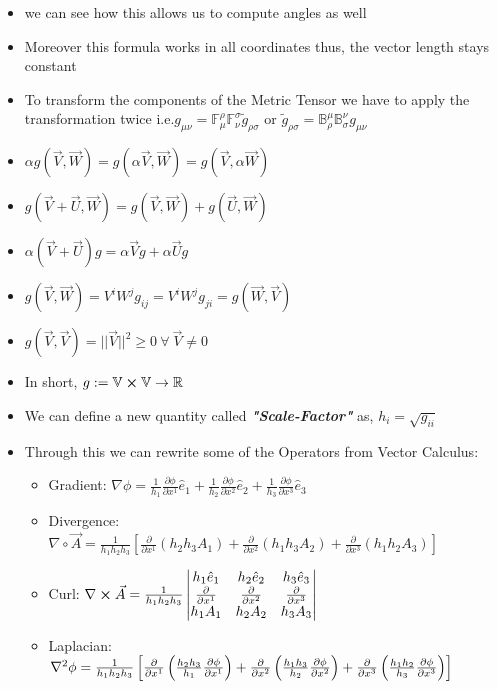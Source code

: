 \begin{itemize}
	\item we can see how this allows us to compute angles as well
	\item Moreover this formula works in all coordinates thus, the vector length stays constant
	\item To transform the components of the Metric Tensor we have to apply the transformation twice i.e.$g_{\mu \nu} = \mathbb{F}^{\rho}_{\mu} \mathbb{F}^{\sigma}_{\nu}\tilde{g}_{\rho \sigma}$ or $\tilde{g}_{\rho \sigma} = \mathbb{B}^{\mu}_{\rho} \mathbb{B}^{\nu}_{\sigma}g_{\mu \nu}$
	\item $\alpha g(\vec{V}, \vec{W}) = g(\alpha\vec{V}, \vec{W}) =  g(\vec{V}, \alpha\vec{W})$
	\item $g(\vec{V} + \vec{U}, \vec{W}) = g(\vec{V}, \vec{W}) + g(\vec{U}, \vec{W})$
	\item $\alpha(\vec{V} + \vec{U})g = \alpha\vec{V}g + \alpha\vec{U}g$
	\item $g(\vec{V}, \vec{W}) = V^{i}W^{j}g_{ij} = V^{i}W^{j}g_{ji} = g(\vec{W}, \vec{V})$
	\item $g(\vec{V}, \vec{V}) = ||\vec{V}||^{2} \geq 0 \ \forall \ \vec{V} \neq 0$
	\item In short, $g := \mathbb{V} \cross \mathbb{V} \rightarrow \mathbb{R}$
	\item We can define a new quantity called \textit{\textbf{"Scale-Factor"}} as, $h_{i} = \sqrt{g_{ii}}$
	\item Through this we can rewrite some of the Operators from Vector Calculus:
	\begin{itemize}
		\item Gradient: $\nabla \phi = \frac{1}{h_{1}}\frac{\partial \phi}{\partial x^{1}}\hat{e}_{1} + \frac{1}{h_{2}}\frac{\partial \phi}{\partial x^{2}}\hat{e}_{2} + \frac{1}{h_{3}}\frac{\partial \phi}{\partial x^{3}}\hat{e}_{3}$
		\item Divergence: $\nabla \circ \vec{A} = \frac{1}{{h}_{1}{h}_{2}{h}_{3}} \left[\frac{\partial}{\partial x^{1}}(h_{2}h_{3}A_{1}) + \frac{\partial}{\partial x^{2}}(h_{1}h_{3}A_{2}) + \frac{\partial}{\partial x^{3}}(h_{1}h_{2}A_{3}) \right]$
		\item Curl: $\nabla \cross \vec{A} = \frac{1}{{h}_{1}{h}_{2}{h}_{3}} \begin{vmatrix}
		h_{1}\hat{e}_{1} & h_{2}\hat{e}_{2} & h_{3}\hat{e}_{3}\\
		\frac{\partial }{\partial x^{1}} & \frac{\partial }{\partial x^{2}} & \frac{\partial }{\partial x^{3}}\\
		h_{1}{A}_{1} & h_{2}{A}_{2} & h_{3}{A}_{3}
		\end{vmatrix}$
		\item Laplacian:$\laplacian{\phi} = \frac{1}{{h}_{1}{h}_{2}{h}_{3}}\left[\frac{\partial}{\partial x^{1}} \left( \frac{h_{2}h_{3}}{h_{1}} \frac{\partial \phi}{\partial x^{1}}\right) + \frac{\partial}{\partial x^{2}} \left( \frac{h_{1}h_{3}}{h_{2}} \frac{\partial \phi}{\partial x^{2}}\right) + \frac{\partial}{\partial x^{3}} \left( \frac{h_{1}h_{2}}{h_{3}} \frac{\partial \phi}{\partial x^{3}}\right) \right]$
	\end{itemize}
\end{itemize}


